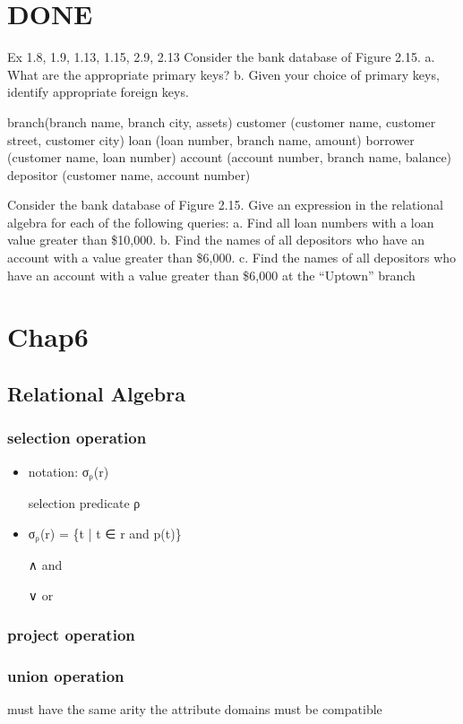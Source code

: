 \documentclass[11pt]{article}
\begin{document}
\section{{\bfseries\sffamily DONE} }
\label{sec-3}
  Ex 1.8, 1.9, 1.13, 1.15, 2.9, 2.13
Consider the bank database of Figure 2.15.
a. What are the appropriate primary keys?
b. Given your choice of primary keys, identify appropriate foreign keys.

branch(branch name, branch city, assets)
customer (customer name, customer street, customer city)
loan (loan number, branch name, amount)
borrower (customer name, loan number)
account (account number, branch name, balance)
depositor (customer name, account number)

Consider the bank database of Figure 2.15. Give an expression in the relational
algebra for each of the following queries:
a. Find all loan numbers with a loan value greater than \$10,000.
b. Find the names of all depositors who have an account with a value
greater than \$6,000.
c. Find the names of all depositors who have an account with a value
greater than \$6,000 at the “Uptown” branch
\section{Chap6}
\label{sec-4}
\subsection{Relational Algebra}
\label{sec-4-1}
\subsubsection{selection operation}
\label{sec-4-1-1}
\begin{itemize}
\item notation: σ$_{\text{ρ}}$(r)
\item[{selection predicate}] ρ
\item σ$_{\text{ρ}}$(r) = \{t | t ∈ r and p(t)\}
\item[{∧}] and
\item[{∨}] or
\end{itemize}
\subsubsection{project operation}
\label{sec-4-1-2}
\subsubsection{union operation}
\label{sec-4-1-3}
must have the same arity
the attribute domains must be compatible
\end{document}
